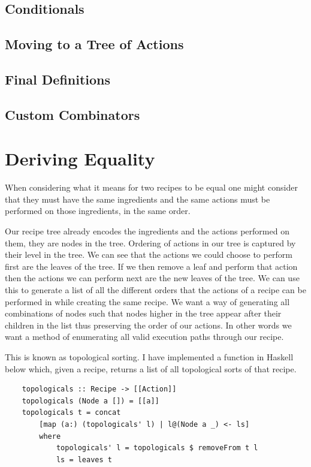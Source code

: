 \documentclass[11pt]{article}
\begin{document}
\subsection{Conditionals}
\subsection{Moving to a Tree of Actions}
\subsection{Final Definitions}
\subsection{Custom Combinators}

\section{Deriving Equality}

When considering what it means for two recipes to be equal one
might consider that they must have the same ingredients
and the same actions must be performed on those ingredients,
in the same order.

\medbreak

Our recipe tree already encodes the ingredients and the actions
performed on them, they are nodes in the tree. Ordering of
actions in our tree is captured by their level in the tree.
We can see that the actions we could choose to perform first
are the leaves of the tree. If we then remove a leaf and perform
that action then the actions we can perform next are the new
leaves of the tree. We can use this to generate a list of all
the different orders that the actions of a recipe can be performed
in while creating the same recipe. We want a way of generating
all combinations of nodes such that nodes higher in the tree
appear after their children in the list thus preserving the
order of our actions. In other words we want a method of enumerating
all valid execution paths through our recipe.

\medbreak

This is known as topological sorting. I have implemented a
function in Haskell below which, given a recipe, returns a list
of all topological sorts of that recipe.

\begin{lstlisting}
    topologicals :: Recipe -> [[Action]]
    topologicals (Node a []) = [[a]]
    topologicals t = concat
        [map (a:) (topologicals' l) | l@(Node a _) <- ls]
        where
            topologicals' l = topologicals $ removeFrom t l
            ls = leaves t
\end{lstlisting}
\end{document}
